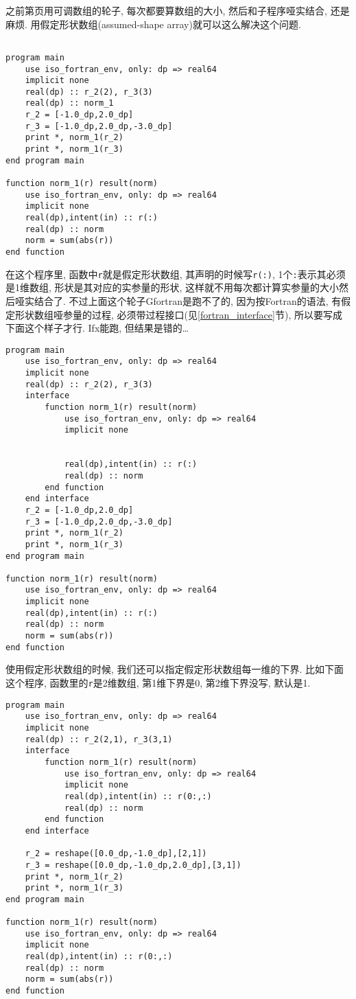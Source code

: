 之前第\pageref{adjustable_array}页用可调数组的轮子, 每次都要算数组的大小, 然后和子程序哑实结合, 还是麻烦. 用假定形状数组(assumed-shape array)就可以这么解决这个问题.
\begin{lstlisting}

program main
    use iso_fortran_env, only: dp => real64
    implicit none
    real(dp) :: r_2(2), r_3(3)
    real(dp) :: norm_1
    r_2 = [-1.0_dp,2.0_dp]
    r_3 = [-1.0_dp,2.0_dp,-3.0_dp]
    print *, norm_1(r_2)
    print *, norm_1(r_3)
end program main

function norm_1(r) result(norm)
    use iso_fortran_env, only: dp => real64
    implicit none
    real(dp),intent(in) :: r(:)
    real(dp) :: norm
    norm = sum(abs(r))
end function
\end{lstlisting}
在这个程序里, 函数中\texttt{r}就是假定形状数组, 其声明的时候写\texttt{r(:)}, 1个\texttt{:}表示其必须是1维数组, 形状是其对应的实参量的形状, 这样就不用每次都计算实参量的大小然后哑实结合了. 不过上面这个轮子Gfortran是跑不了的, 因为按Fortran的语法, 有假定形状数组哑参量的过程, 必须带过程接口(见\ref{fortran_interface}节), 所以要写成下面这个样子才行. Ifx能跑, 但结果是错的\dots\label{assumed-shape_array_program}
\begin{lstlisting}
program main
    use iso_fortran_env, only: dp => real64
    implicit none
    real(dp) :: r_2(2), r_3(3)
    interface
        function norm_1(r) result(norm)
            use iso_fortran_env, only: dp => real64
            implicit none


            real(dp),intent(in) :: r(:)
            real(dp) :: norm
        end function
    end interface
    r_2 = [-1.0_dp,2.0_dp]
    r_3 = [-1.0_dp,2.0_dp,-3.0_dp]
    print *, norm_1(r_2)
    print *, norm_1(r_3)
end program main

function norm_1(r) result(norm)
    use iso_fortran_env, only: dp => real64
    implicit none
    real(dp),intent(in) :: r(:)
    real(dp) :: norm
    norm = sum(abs(r))
end function
\end{lstlisting}
使用假定形状数组的时候, 我们还可以指定假定形状数组每一维的下界. 比如下面这个程序, 函数里的\texttt{r}是2维数组, 第1维下界是0, 第2维下界没写, 默认是1.
\begin{lstlisting}
program main
    use iso_fortran_env, only: dp => real64
    implicit none
    real(dp) :: r_2(2,1), r_3(3,1)
    interface
        function norm_1(r) result(norm)
            use iso_fortran_env, only: dp => real64
            implicit none
            real(dp),intent(in) :: r(0:,:)
            real(dp) :: norm
        end function
    end interface

    r_2 = reshape([0.0_dp,-1.0_dp],[2,1])
    r_3 = reshape([0.0_dp,-1.0_dp,2.0_dp],[3,1])
    print *, norm_1(r_2)
    print *, norm_1(r_3)
end program main

function norm_1(r) result(norm)
    use iso_fortran_env, only: dp => real64
    implicit none
    real(dp),intent(in) :: r(0:,:)
    real(dp) :: norm
    norm = sum(abs(r))
end function
\end{lstlisting}

